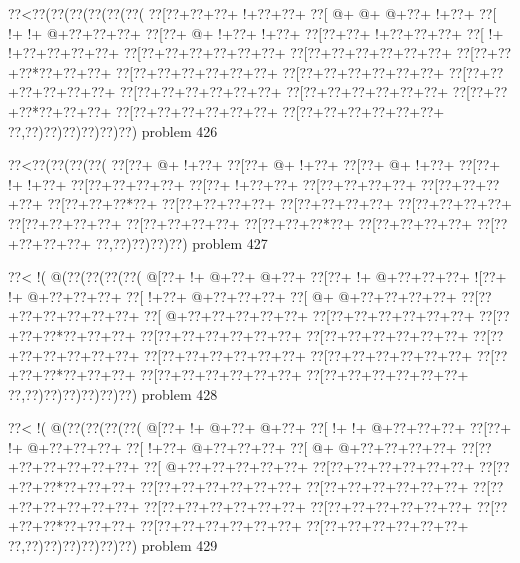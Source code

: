 \vbox{\vbox{\goo
\0??<\0??(\0??(\0??(\0??(\0??(\0??(
\0??[\0??+\0??+\0??+\- !+\0??+\0??+
\0??[\- @+\- @+\- @+\0??+\- !+\0??+
\0??[\- !+\- !+\- @+\0??+\0??+\0??+
\0??[\0??+\- @+\- !+\0??+\- !+\0??+
\0??[\0??+\0??+\- !+\0??+\0??+\0??+
\0??[\- !+\- !+\0??+\0??+\0??+\0??+
\0??[\0??+\0??+\0??+\0??+\0??+\0??+
\0??[\0??+\0??+\0??+\0??+\0??+\0??+
\0??[\0??+\0??+\0??*\0??+\0??+\0??+
\0??[\0??+\0??+\0??+\0??+\0??+\0??+
\0??[\0??+\0??+\0??+\0??+\0??+\0??+
\0??[\0??+\0??+\0??+\0??+\0??+\0??+
\0??[\0??+\0??+\0??+\0??+\0??+\0??+
\0??[\0??+\0??+\0??+\0??+\0??+\0??+
\0??[\0??+\0??+\0??*\0??+\0??+\0??+
\0??[\0??+\0??+\0??+\0??+\0??+\0??+
\0??[\0??+\0??+\0??+\0??+\0??+\0??+
\0??,\0??)\0??)\0??)\0??)\0??)\0??)
}
\hfil problem 426\hfil\break
}

\vbox{\vbox{\goo
\0??<\0??(\0??(\0??(\0??(
\0??[\0??+\- @+\- !+\0??+
\0??[\0??+\- @+\- !+\0??+
\0??[\0??+\- @+\- !+\0??+
\0??[\0??+\- !+\- !+\0??+
\0??[\0??+\0??+\0??+\0??+
\0??[\0??+\- !+\0??+\0??+
\0??[\0??+\0??+\0??+\0??+
\0??[\0??+\0??+\0??+\0??+
\0??[\0??+\0??+\0??*\0??+
\0??[\0??+\0??+\0??+\0??+
\0??[\0??+\0??+\0??+\0??+
\0??[\0??+\0??+\0??+\0??+
\0??[\0??+\0??+\0??+\0??+
\0??[\0??+\0??+\0??+\0??+
\0??[\0??+\0??+\0??*\0??+
\0??[\0??+\0??+\0??+\0??+
\0??[\0??+\0??+\0??+\0??+
\0??,\0??)\0??)\0??)\0??)
}
\hfil problem 427\hfil\break
}

\vbox{\vbox{\goo
\0??<\- !(\- @(\0??(\0??(\0??(\0??(
\- @[\0??+\- !+\- @+\0??+\- @+\0??+
\0??[\0??+\- !+\- @+\0??+\0??+\0??+
\- ![\0??+\- !+\- @+\0??+\0??+\0??+
\0??[\- !+\0??+\- @+\0??+\0??+\0??+
\0??[\- @+\- @+\0??+\0??+\0??+\0??+
\0??[\0??+\0??+\0??+\0??+\0??+\0??+
\0??[\- @+\0??+\0??+\0??+\0??+\0??+
\0??[\0??+\0??+\0??+\0??+\0??+\0??+
\0??[\0??+\0??+\0??*\0??+\0??+\0??+
\0??[\0??+\0??+\0??+\0??+\0??+\0??+
\0??[\0??+\0??+\0??+\0??+\0??+\0??+
\0??[\0??+\0??+\0??+\0??+\0??+\0??+
\0??[\0??+\0??+\0??+\0??+\0??+\0??+
\0??[\0??+\0??+\0??+\0??+\0??+\0??+
\0??[\0??+\0??+\0??*\0??+\0??+\0??+
\0??[\0??+\0??+\0??+\0??+\0??+\0??+
\0??[\0??+\0??+\0??+\0??+\0??+\0??+
\0??,\0??)\0??)\0??)\0??)\0??)\0??)
}
\hfil problem 428\hfil\break
}

\vbox{\vbox{\goo
\0??<\- !(\- @(\0??(\0??(\0??(\0??(
\- @[\0??+\- !+\- @+\0??+\- @+\0??+
\0??[\- !+\- !+\- @+\0??+\0??+\0??+
\0??[\0??+\- !+\- @+\0??+\0??+\0??+
\0??[\- !+\0??+\- @+\0??+\0??+\0??+
\0??[\- @+\- @+\0??+\0??+\0??+\0??+
\0??[\0??+\0??+\0??+\0??+\0??+\0??+
\0??[\- @+\0??+\0??+\0??+\0??+\0??+
\0??[\0??+\0??+\0??+\0??+\0??+\0??+
\0??[\0??+\0??+\0??*\0??+\0??+\0??+
\0??[\0??+\0??+\0??+\0??+\0??+\0??+
\0??[\0??+\0??+\0??+\0??+\0??+\0??+
\0??[\0??+\0??+\0??+\0??+\0??+\0??+
\0??[\0??+\0??+\0??+\0??+\0??+\0??+
\0??[\0??+\0??+\0??+\0??+\0??+\0??+
\0??[\0??+\0??+\0??*\0??+\0??+\0??+
\0??[\0??+\0??+\0??+\0??+\0??+\0??+
\0??[\0??+\0??+\0??+\0??+\0??+\0??+
\0??,\0??)\0??)\0??)\0??)\0??)\0??)
}
\hfil problem 429\hfil\break
}


